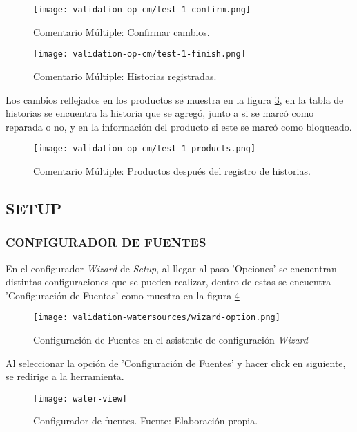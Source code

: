 \begin{figure}[H]
	\centering
	\texttt{[image: validation-op-cm/test-1-confirm.png]}
	\caption{\label{fig:op-test-1-confirm-cm} Comentario Múltiple: Confirmar cambios.}
\end{figure}

\begin{figure}[H]
	\centering
	\texttt{[image: validation-op-cm/test-1-finish.png]}
	\caption{\label{fig:op-test-1-finish-cm} Comentario Múltiple: Historias registradas.}
\end{figure}

Los cambios reflejados en los productos se muestra en la figura \ref{fig:op-test-1-products-cm}, en la tabla de historias se encuentra la historia que se agregó, junto a si se marcó como reparada o no, y en la información del producto si este se marcó como bloqueado.

\begin{figure}[H]
	\centering
	\texttt{[image: validation-op-cm/test-1-products.png]}
	\caption{\label{fig:op-test-1-products-cm} Comentario Múltiple: Productos después del registro de historias.}
\end{figure}

\subsection{SETUP}

\subsubsection{CONFIGURADOR DE FUENTES}

En el configurador \textit{Wizard} de \textit{Setup}, al llegar al paso 'Opciones' se encuentran distintas configuraciones que se pueden realizar, dentro de estas se encuentra 'Configuración de Fuentas' como muestra en la figura \ref{fig:ws-wizard-option}

\begin{figure}[H]
	\centering
	\texttt{[image: validation-watersources/wizard-option.png]}
	\caption{\label{fig:ws-wizard-option} Configuración de Fuentes en el asistente de configuración \textit{Wizard}}
\end{figure}

Al seleccionar la opción de 'Configuración de Fuentes' y hacer click en siguiente, se redirige a la herramienta.

\begin{figure}[H]
	\centering
	\texttt{[image: water-view]}
	\caption{\label{fig:water-view} Configurador de fuentes. Fuente: Elaboración propia.}
\end{figure}

